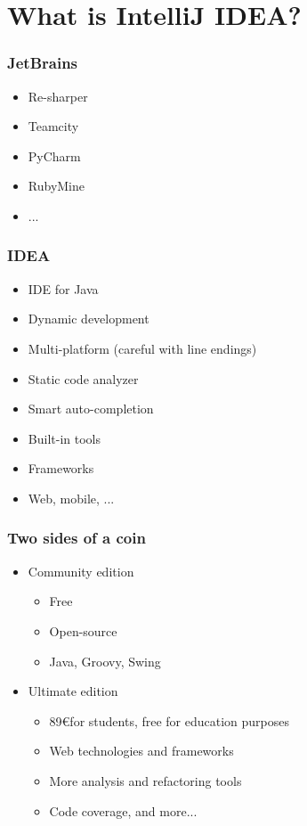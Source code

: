 \section{What is IntelliJ IDEA?}

\begin{frame}
\frametitle{JetBrains}
  \begin{itemize}
    \item Re-sharper
    \item Teamcity
    \item PyCharm
    \item RubyMine
    \item ...
  \end{itemize}
\end{frame}

\begin{frame}
\frametitle{IDEA}
  \begin{itemize}
    \item IDE for Java
    \item Dynamic development
    \item Multi-platform (careful with line endings)
    \item Static code analyzer
    \item Smart auto-completion
    \item Built-in tools
    \item Frameworks
    \item Web, mobile, ...
  \end{itemize}
\end{frame}

\begin{frame}
\frametitle{Two sides of a coin}
  \begin{itemize}
    \item Community edition
      \begin{itemize}
        \item Free
        \item Open-source
        \item Java, Groovy, Swing
      \end{itemize}
    \item Ultimate edition
      \begin{itemize}
        \item 89\euro for students, free for education purposes
        \item Web technologies and frameworks
        \item More analysis and refactoring tools
        \item Code coverage, and more...
      \end{itemize}
  \end{itemize}
\end{frame}

